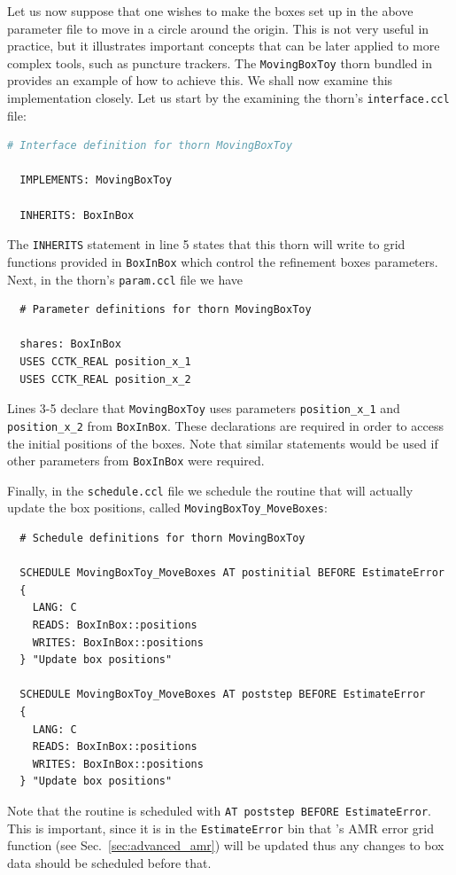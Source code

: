Let us now suppose that one wishes to make the boxes set up in the above parameter file to move in a circle around the origin. This is not very useful in practice, but it illustrates important concepts that can be later applied to more complex tools, such as puncture trackers. The \texttt{MovingBoxToy} thorn bundled in \CarpetX\space provides an example of how to achieve this. We shall now examine this implementation closely. Let us start by the examining the thorn's \texttt{interface.ccl} file:
%
\begin{lstlisting}[language=bash]
  # Interface definition for thorn MovingBoxToy

  IMPLEMENTS: MovingBoxToy

  INHERITS: BoxInBox
\end{lstlisting}

The \texttt{INHERITS} statement in line 5 states that this thorn will write to grid functions provided in \texttt{BoxInBox} which control the refinement boxes parameters. Next, in the thorn's \texttt{param.ccl} file we have
%
\begin{lstlisting}
  # Parameter definitions for thorn MovingBoxToy

  shares: BoxInBox
  USES CCTK_REAL position_x_1
  USES CCTK_REAL position_x_2
\end{lstlisting}

Lines 3-5 declare that \texttt{MovingBoxToy} uses parameters \texttt{position\_x\_1} and \texttt{position\_x\_2} from \texttt{BoxInBox}. These declarations are required in order to access the initial positions of the boxes. Note that similar statements would be used if other parameters from \texttt{BoxInBox} were required.

Finally, in the \texttt{schedule.ccl} file we schedule the routine that will actually update the box positions, called \texttt{MovingBoxToy\_MoveBoxes}:
%
\begin{lstlisting}
  # Schedule definitions for thorn MovingBoxToy

  SCHEDULE MovingBoxToy_MoveBoxes AT postinitial BEFORE EstimateError
  {
    LANG: C
    READS: BoxInBox::positions
    WRITES: BoxInBox::positions
  } "Update box positions"

  SCHEDULE MovingBoxToy_MoveBoxes AT poststep BEFORE EstimateError
  {
    LANG: C
    READS: BoxInBox::positions
    WRITES: BoxInBox::positions
  } "Update box positions"
\end{lstlisting}

Note that the routine is scheduled with \texttt{AT poststep BEFORE EstimateError}. This is important, since it is in the \texttt{EstimateError} bin that \CarpetX's AMR error grid function (see Sec.~\ref{sec:advanced_amr}) will be updated thus any changes to box data should be scheduled before that.

